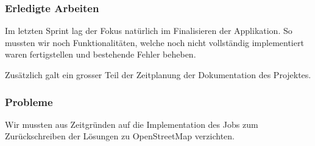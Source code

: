 \subsubsection{Erledigte Arbeiten}

Im letzten Sprint lag der Fokus natürlich im Finalisieren der Applikation.
So mussten wir noch Funktionalitäten, welche noch nicht vollständig implementiert waren fertigstellen und bestehende Fehler beheben.

Zusätzlich galt ein grosser Teil der Zeitplanung der Dokumentation des Projektes.

\subsubsection{Probleme}
Wir mussten aus Zeitgründen auf die Implementation des Jobs zum Zurückschreiben der Lösungen zu OpenStreetMap verzichten.